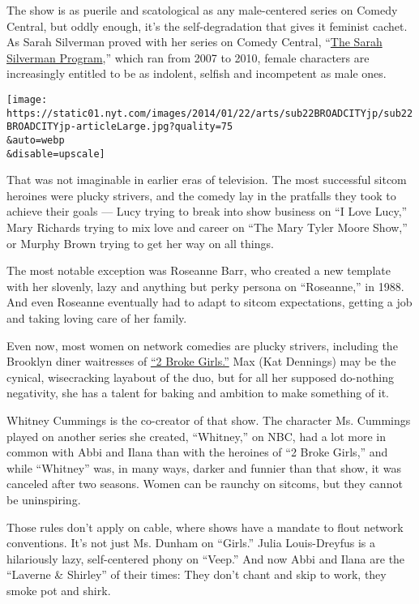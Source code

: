 The show is as puerile and scatological as any male-centered series on
Comedy Central, but oddly enough, it's the self-degradation that gives
it feminist cachet. As Sarah Silverman proved with her series on Comedy
Central,
``\href{http://www.nytimes.com/2008/10/23/arts/television/23silv.html}{The
Sarah Silverman Program},'' which ran from 2007 to 2010, female
characters are increasingly entitled to be as indolent, selfish and
incompetent as male ones.

\texttt{[image: https://static01.nyt.com/images/2014/01/22/arts/sub22BROADCITYjp/sub22BROADCITYjp-articleLarge.jpg?quality=75\\\&auto=webp\\\&disable=upscale]}

That was not imaginable in earlier eras of television. The most
successful sitcom heroines were plucky strivers, and the comedy lay in
the pratfalls they took to achieve their goals --- Lucy trying to break
into show business on ``I Love Lucy,'' Mary Richards trying to mix love
and career on ``The Mary Tyler Moore Show,'' or Murphy Brown trying to
get her way on all things.

The most notable exception was Roseanne Barr, who created a new template
with her slovenly, lazy and anything but perky persona on ``Roseanne,''
in 1988. And even Roseanne eventually had to adapt to sitcom
expectations, getting a job and taking loving care of her family.

Even now, most women on network comedies are plucky strivers, including
the Brooklyn diner waitresses of
\href{http://www.cbs.com/shows/2_broke_girls/}{``2 Broke Girls.''} Max
(Kat Dennings) may be the cynical, wisecracking layabout of the duo, but
for all her supposed do-nothing negativity, she has a talent for baking
and ambition to make something of it.

Whitney Cummings is the co-creator of that show. The character Ms.
Cummings played on another series she created, ``Whitney,'' on NBC, had
a lot more in common with Abbi and Ilana than with the heroines of ``2
Broke Girls,'' and while ``Whitney'' was, in many ways, darker and
funnier than that show, it was canceled after two seasons. Women can be
raunchy on sitcoms, but they cannot be uninspiring.

Those rules don't apply on cable, where shows have a mandate to flout
network conventions. It's not just Ms. Dunham on ``Girls.'' Julia
Louis-Dreyfus is a hilariously lazy, self-centered phony on ``Veep.''
And now Abbi and Ilana are the ``Laverne \& Shirley'' of their times:
They don't chant and skip to work, they smoke pot and shirk.

